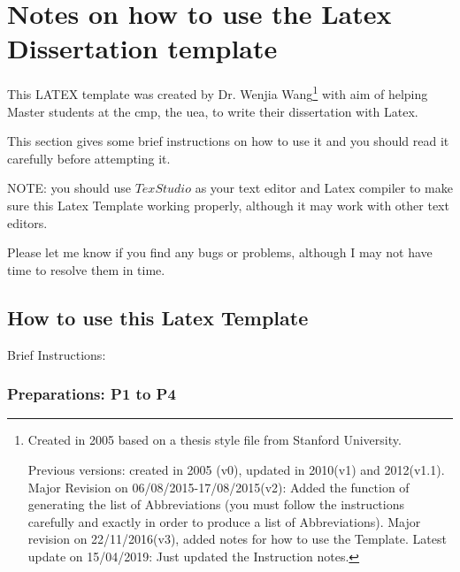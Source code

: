 % 
\def\baselinestretch{1}

\chapter{Notes on how to use the Latex Dissertation template}

\def\baselinestretch{1.66}

This LATEX template was created by Dr. Wenjia Wang\footnote{Created in 2005 based on a thesis style file from Stanford University. 

Previous versions: created in 2005 (v0), updated in 2010(v1) and 2012(v1.1).  
	Major Revision on 06/08/2015-17/08/2015(v2): Added the function of generating the list of Abbreviations (you must follow the instructions carefully and exactly in order to produce a list of Abbreviations). 
	Major revision on 22/11/2016(v3), added notes for how to use the Template.   
	Latest update on 15/04/2019: Just updated the Instruction notes.  }
with aim of helping Master students at the \gls{cmp}, the \gls{uea}, to write their dissertation with Latex.  %

This section gives some brief instructions on how to use it and you should read it carefully before attempting it.

NOTE: you should use $TexStudio$ as your text editor and Latex compiler to make sure this Latex  Template working properly, although it may work with other text editors.
 
 
Please let me know if you find any bugs or problems, although I may not have time to resolve them in time.
 
 
\section{How to use this Latex Template}

  
 
 Brief Instructions:
 
\subsection{Preparations: P1 to P4} 
 
